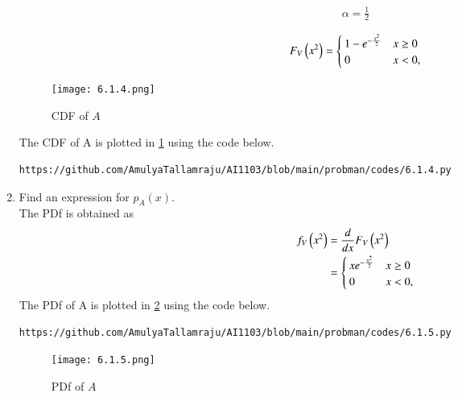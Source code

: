 \documentclass[journal,12pt,twocolumn]{IEEEtran}
\renewcommand\thesection{\arabic{section}}
\renewcommand\thesubsection{\thesection.\arabic{subsection}}
\begin{document}
\begin{enumerate}[label=\thesubsection.\arabic*.,ref=\thesubsection.\theenumi]
\begin{align}
\alpha = \frac{1}{2}
\end{align}

%
\begin{align} 
F_V\left(x^2\right) = 
\begin{cases}
1 - e^{- \frac{x^2}{2}} & x \geq 0 \\
0 & x < 0,
\end{cases}
\end{align}
\begin{figure}[!ht]
\centering
\texttt{[image: 6.1.4.png]}
\caption{CDF of $A$}
\label{fig:probman_trans_cdf_A}
\end{figure}
The CDF of A is plotted in \ref{fig:probman_trans_cdf_A} using the code below.
\begin{lstlisting}
https://github.com/AmulyaTallamraju/AI1103/blob/main/probman/codes/6.1.4.py
\end{lstlisting}
%
\item
Find an expression for $p_{A}(x)$.
\\
\solution
The PDf is obtained as
\begin{align}
f_V\left(x^2\right) &= \frac{d}{dx}F_V\left(x^2\right)
\\
&=
\begin{cases}
x e^{- \frac{x^2}{2}} & x \geq 0 \\
0 & x < 0,
\end{cases}
\end{align}
The PDf of A is plotted in \ref{fig:probman_trans_pdf_A} using the code below.
\begin{lstlisting}
https://github.com/AmulyaTallamraju/AI1103/blob/main/probman/codes/6.1.5.py
\end{lstlisting}
\begin{figure}[!ht]
\centering
\texttt{[image: 6.1.5.png]}
\caption{PDf of $A$}
\label{fig:probman_trans_pdf_A}
\end{figure}


%
\end{enumerate}
\end{document}
